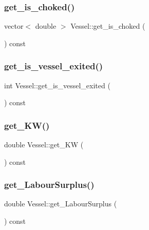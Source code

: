 \subsubsection{\texorpdfstring{get\_is\_choked()}{get\_is\_choked()}}
{\footnotesize\ttfamily vector$<$ double $>$ Vessel\+::get\+\_\+is\+\_\+choked (\begin{DoxyParamCaption}{ }\end{DoxyParamCaption}) const}

\mbox{\label{class_vessel_a0b131e89c0cbbe611f8a3422569b5ed1}} 
\subsubsection{\texorpdfstring{get\_is\_vessel\_exited()}{get\_is\_vessel\_exited()}}
{\footnotesize\ttfamily int Vessel\+::get\+\_\+is\+\_\+vessel\+\_\+exited (\begin{DoxyParamCaption}{ }\end{DoxyParamCaption}) const}

\mbox{\label{class_vessel_a3c263e48de680fec1a97d5a529deded0}} 
\subsubsection{\texorpdfstring{get\_KW()}{get\_KW()}}
{\footnotesize\ttfamily double Vessel\+::get\+\_\+\+KW (\begin{DoxyParamCaption}{ }\end{DoxyParamCaption}) const}

\mbox{\label{class_vessel_ac529f9826cf4fcf84a43cd3412913f6d}} 
\subsubsection{\texorpdfstring{get\_LabourSurplus()}{get\_LabourSurplus()}}
{\footnotesize\ttfamily double Vessel\+::get\+\_\+\+Labour\+Surplus (\begin{DoxyParamCaption}{ }\end{DoxyParamCaption}) const}

